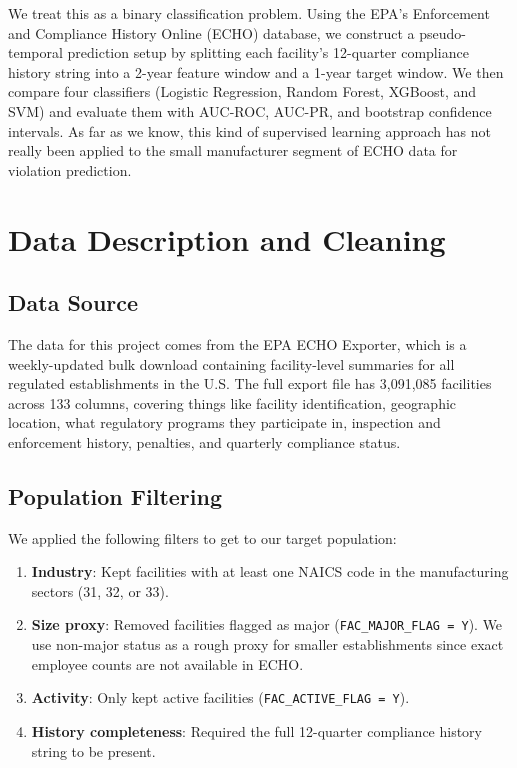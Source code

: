 \documentclass[11pt]{article}
\begin{document}
We treat this as a binary classification problem. Using the EPA's Enforcement and Compliance History Online (ECHO) database, we construct a pseudo-temporal prediction setup by splitting each facility's 12-quarter compliance history string into a 2-year feature window and a 1-year target window. We then compare four classifiers (Logistic Regression, Random Forest, XGBoost, and SVM) and evaluate them with AUC-ROC, AUC-PR, and bootstrap confidence intervals. As far as we know, this kind of supervised learning approach has not really been applied to the small manufacturer segment of ECHO data for violation prediction.


\section{Data Description and Cleaning}

\subsection{Data Source}

The data for this project comes from the EPA ECHO Exporter, which is a weekly-updated bulk download containing facility-level summaries for all regulated establishments in the U.S. The full export file has 3,091,085 facilities across 133 columns, covering things like facility identification, geographic location, what regulatory programs they participate in, inspection and enforcement history, penalties, and quarterly compliance status.

\subsection{Population Filtering}

We applied the following filters to get to our target population:
\begin{enumerate}
    \item \textbf{Industry}: Kept facilities with at least one NAICS code in the manufacturing sectors (31, 32, or 33).
    \item \textbf{Size proxy}: Removed facilities flagged as major (\texttt{FAC\_MAJOR\_FLAG = Y}). We use non-major status as a rough proxy for smaller establishments since exact employee counts are not available in ECHO.
    \item \textbf{Activity}: Only kept active facilities (\texttt{FAC\_ACTIVE\_FLAG = Y}).
    \item \textbf{History completeness}: Required the full 12-quarter compliance history string to be present.
\end{enumerate}
\end{document}

